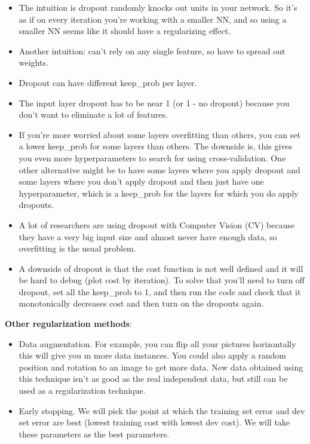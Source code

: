 \documentclass{article}
\begin{document}
\begin{itemize}
  \item The intuition is dropout randomly knocks out units in your network. So it's as if on every iteration you're working with a smaller NN, and so using a smaller NN seems like it should have a regularizing effect.
  \item Another intuition: can't rely on any single feature, so have to spread out weights.
  \item Dropout can have different keep\_prob per layer.
  \item The input layer dropout has to be near 1 (or 1 - no dropout) because you don't want to eliminate a lot of features.
  \item If you're more worried about some layers overfitting than others, you can set a lower keep\_prob for some layers than others. The downside is, this gives you even more hyperparameters to search for using cross-validation. One other alternative might be to have some layers where you apply dropout and some layers where you don't apply dropout and then just have one hyperparameter, which is a keep\_prob for the layers for which you do apply dropouts.
  \item A lot of researchers are using dropout with Computer Vision (CV) because they have a very big input size and almost never have enough data, so overfitting is the usual problem.
  \item A downside of dropout is that the cost function is not well defined and it will be hard to debug (plot cost by iteration). To solve that you'll need to turn off dropout, set all the keep\_prob to 1, and then run the code and check that it monotonically decreases cost and then turn on the dropouts again.
\end{itemize}

\noindent \textbf{Other regularization methods}:

\begin{itemize}
  \item Data augmentation. For example, you can flip all your pictures horizontally this will give you m more data instances. You could also apply a random position and rotation to an image to get more data. New data obtained using this technique isn't as good as the real independent data, but still can be used as a regularization technique.
  \item Early stopping. We will pick the point at which the training set error and dev set error are best (lowest training cost with lowest dev cost). We will take these parameters as the best parameters.
\end{itemize}
\end{document}
